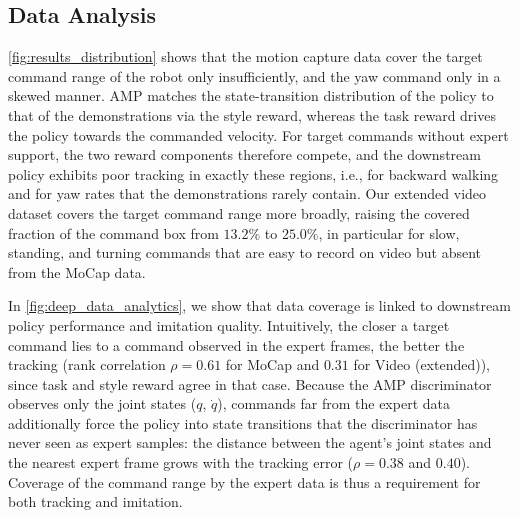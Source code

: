 
\subsection{Data Analysis}

\autoref{fig:results_distribution} shows that the motion capture data cover the target command range of the robot only insufficiently, and the yaw command only in a skewed manner. AMP matches the state-transition distribution of the policy to that of the demonstrations via the style reward, whereas the task reward drives the policy towards the commanded velocity. For target commands without expert support, the two reward components therefore compete, and the downstream policy exhibits poor tracking in exactly these regions, i.e., for backward walking and for yaw rates that the demonstrations rarely contain. Our extended video dataset covers the target command range more broadly, raising the covered fraction of the command box from $13.2\%$ to $25.0\%$, in particular for slow, standing, and turning commands that are easy to record on video but absent from the MoCap data.

In \autoref{fig:deep_data_analytics}, we show that data coverage is linked to downstream policy performance and imitation quality. Intuitively, the closer a target command lies to a command observed in the expert frames, the better the tracking (rank correlation $\rho=0.61$ for MoCap and $0.31$ for Video (extended)), since task and style reward agree in that case. Because the AMP discriminator observes only the joint states ($q$, $\dot{q}$), commands far from the expert data additionally force the policy into state transitions that the discriminator has never seen as expert samples: the distance between the agent's joint states and the nearest expert frame grows with the tracking error ($\rho=0.38$ and $0.40$). Coverage of the command range by the expert data is thus a requirement for both tracking and imitation.

